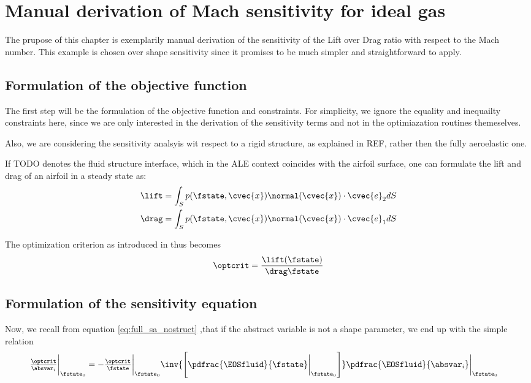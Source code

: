\documentclass[../main.tex]{subfiles}
\begin{document}
\setlength{\delimitershortfall}{0pt}

\section{Manual derivation of Mach sensitivity for ideal gas}

The prupose of this chapter is exemplarily manual derivation of the sensitivity of the Lift over Drag ratio with respect to the Mach number. This example is chosen over shape sensitivity since it promises to be much simpler and straightforward to apply.


\subsection{Formulation of the objective function}
The first step will be the formulation of the objective function and constraints. For simplicity, we ignore the equality and inequailty constraints here, since we are only interested in the derivation of the sensitivity terms and not in the optimiazation routines themeselves.

Also, we are considering the sensitivity analsyis wit respect to a rigid structure, as explained in REF, rather then the fully aeroelastic one.

If TODO denotes the fluid structure interface, which in the \ac{ALE} context coincides with the airfoil surface, one can formulate the lift and drag of an airfoil in a steady state as:
\begin{align}
\lift=\int_{S} p(\fstate,\cvec{x}) \normal(\cvec{x})\cdot \cvec{e}_2 dS \\
\drag=\int_{S} p(\fstate,\cvec{x}) \normal(\cvec{x})\cdot \cvec{e}_1 dS \\
\end{align}

The optimization criterion as introduced in \REF thus becomes
\begin{align}
\optcrit=\frac{\lift(\fstate)}{\drag\fstate}
\end{align}


\subsection{Formulation of the sensitivity equation}
Now, we recall from equation \eqref{eq:full_sa_nostruct} ,that if the abstract variable is not a shape parameter, we end up with the simple relation
\begin{align}\label{eq:manualmach_ToptcritBYabsvarI_expansion}
\tfrac{\optcrit}{\absvar_i}\bigg\rvert_{\fstate_0} &=
-\tfrac{\optcrit}{\fstate}\bigg\rvert_{\fstate_0}
\inv{\left[\pdfrac{\EOSfluid}{\fstate}\bigg\rvert_{\fstate_0}\right]}
\pdfrac{\EOSfluid}{\absvar_i}\bigg\rvert_{\fstate_0}
\end{align}
\end{document}
